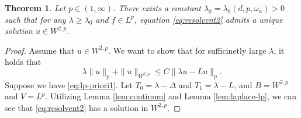 \documentclass[twoside, 12pt]{book}
\numberwithin{equation}{chapter}
\newtheorem{theorem}{Theorem}[section]
\def\geq{\geqslant}
\def\leq{\leqslant}
\begin{document}
	\begin{theorem}
		Let $p\in (1,\infty)$.  There exists a constant $\lambda_0=\lambda_0(d, p, \omega_a)>0$ such that  for any $\lambda\geq \lambda_0$ and $f\in L^p$, equation  \eqref{eq:resolvent2} admits  a unique solution $u\in W^{2,p}$. 
	\end{theorem}
	\begin{proof}
		Assume that $u\in W^{2,p}$. We want to show that for sufficinetly large $\lambda$, it holds that 
		\begin{equation}\label{eq:lp-priori1}
			 \lambda \|u\|_p+\|u\|_{W^{2,p}} \leq C \|\lambda u- L u\|_p. 
		\end{equation}
		Suppose we have \eqref{eq:lp-priori1}. Let $T_0=\lambda - \Delta$ and $T_1=\lambda - L$, and $B=W^{2,p}$ and $V=L^p$. Utilizing Lemma \ref{lem:continum} and Lemma \ref{lem:laplace-lp}, we can see that \eqref{eq:resolvent2} has a solution in $W^{2,p}$. 
		

\end{proof}
\end{document}

